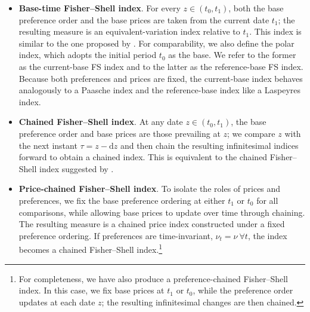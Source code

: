 \documentclass[12pt,a4paper]{article}
\begin{document}
\begin{itemize}

\item[(i)] \textbf{Base-time Fisher–Shell index}.  
For every \(z\in(t_{0},t_{1})\), both the base preference order and the base prices are taken from the current date \(t_{1}\); the resulting measure is an equivalent-variation index relative to \(t_{1}\).  
This index is similar to the one proposed by \cite{BB2023welfare}.
For comparability, we also define the polar index, which adopts the initial period \(t_{0}\) as the base.  
We refer to the former as the current-base FS index and to the latter as the reference-base FS index.
Because both preferences and prices are fixed, the current-base index behaves analogously to a Paasche index and the reference-base index like a Laspeyres index.

\item[(ii)] \textbf{Chained Fisher–Shell index}.  
At any date \(z\in(t_0,t_1)\), the base preference order and base prices are those prevailing at \(z\); we compare \(z\) with the next instant \(\tau = z - \mathrm{d}z\) and then chain the resulting infinitesimal indices forward to obtain a chained index. This is equivalent to the chained Fisher–Shell index suggested by \cite{duran_licandro_2024}.
\end{itemize}

\begin{itemize}
\item[(iii)] \textbf{Price-chained Fisher–Shell index}.  
To isolate the roles of prices and preferences, we fix the base preference ordering at either \( t_1 \) or \( t_0 \) for all comparisons, while allowing base prices to update over time through chaining. The resulting measure is a chained price index constructed under a fixed preference ordering. If preferences are time-invariant, \( \nu_t = \nu \ \forall t \), the index becomes a chained Fisher--Shell index.\footnote{For completeness, we have also produce a preference-chained Fisher–Shell index.  
In this case, we fix base prices at \(t_{1}\) or \(t_0\), while the preference order updates at each date \(z\); the resulting infinitesimal changes are then chained. }

\end{itemize}
\end{document}
